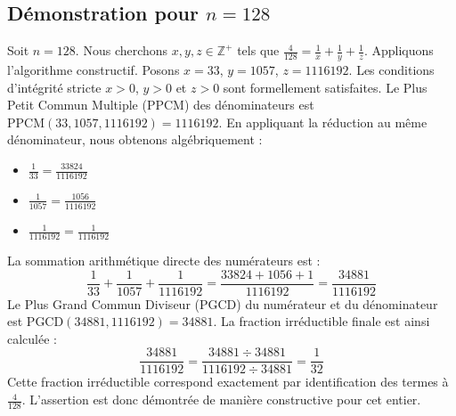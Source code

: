 \documentclass[11pt,a4paper]{article}
\begin{document}
\subsection{Démonstration pour $n = 128$}
Soit $n = 128$. Nous cherchons $x, y, z \in \mathbb{Z}^{+}$ tels que $\frac{4}{128} = \frac{1}{x} + \frac{1}{y} + \frac{1}{z}$.
Appliquons l'algorithme constructif. Posons $x = 33$, $y = 1057$, $z = 1116192$.
Les conditions d'intégrité stricte $x > 0$, $y > 0$ et $z > 0$ sont formellement satisfaites.
Le Plus Petit Commun Multiple (PPCM) des dénominateurs est $\text{PPCM}(33, 1057, 1116192) = 1116192$.
En appliquant la réduction au même dénominateur, nous obtenons algébriquement :
\begin{itemize}
    \item $\frac{1}{33} = \frac{33824}{1116192}$
    \item $\frac{1}{1057} = \frac{1056}{1116192}$
    \item $\frac{1}{1116192} = \frac{1}{1116192}$
\end{itemize}
La sommation arithmétique directe des numérateurs est :
$$ \frac{1}{33} + \frac{1}{1057} + \frac{1}{1116192} = \frac{33824 + 1056 + 1}{1116192} = \frac{34881}{1116192} $$
Le Plus Grand Commun Diviseur (PGCD) du numérateur et du dénominateur est $\text{PGCD}(34881, 1116192) = 34881$.
La fraction irréductible finale est ainsi calculée :
$$ \frac{34881}{1116192} = \frac{34881 \div 34881}{1116192 \div 34881} = \frac{1}{32} $$
Cette fraction irréductible correspond exactement par identification des termes à $\frac{4}{128}$. L'assertion est donc démontrée de manière constructive pour cet entier.
\end{document}
